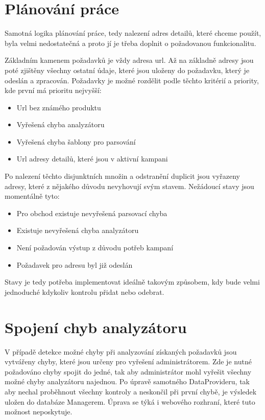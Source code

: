 \documentclass[thesis=B,czech]{FITthesis}[2012/06/26]
\begin{document}
\section{Plánování práce}
Samotná logika plánování práce, tedy nalezení adres detailů, které chceme použít, byla velmi nedostatečná a proto jí je
třeba doplnit o požadovanou funkcionalitu.
\par
Základním kamenem požadavků je vždy adresa url. Až na základně adresy jsou poté zjištěny všechny ostatní údaje, které jsou uloženy do požadavku, který je odeslán a zpracován. Požadavky je možné rozdělit podle těchto kritérií a priority, kde první má prioritu nejvyšší:

\begin{itemize}
\item Url bez známého produktu
\item Vyřešená chyba analyzátoru
\item Vyřešená chyba šablony pro parsování
\item Url adresy detailů, které jsou v aktivní kampani
\end{itemize}

Po nalezení těchto disjunktních množin a odstranění duplicit jsou vyřazeny adresy, které z nějakého důvodu nevyhovují svým stavem.
Nežádoucí stavy jsou momentálně tyto:

\begin{itemize}
\item Pro obchod existuje nevyřešená parsovací chyba
\item Existuje nevyřešená chyba analyzátoru
\item Není požadován výstup z důvodu potřeb kampaní
\item Požadavek pro adresu byl již odeslán
\end{itemize}

Stavy je tedy potřeba implementovat ideálně takovým způsobem, kdy bude velmi jednoduché 
kdykoliv kontrolu přidat nebo odebrat.

\section{Spojení chyb analyzátoru}
V případě detekce možné chyby při analyzování získaných požadavků jsou vytvářeny chyby, které jsou určeny pro vyřešení administrátorem.
Zde je nutné požadováno chyby spojit do jedné, tak aby administrátor mohl vyřešit všechny možné chyby analyzátoru najednou.
Po úpravě samotného DataProvideru, tak aby nechal proběhnout všechny kontroly a neskončil při první chybě, je výsledek uložen do databáze
Managerem. Úprava se týká i webového rozhraní, které tuto možnost neposkytuje.
\end{document}
